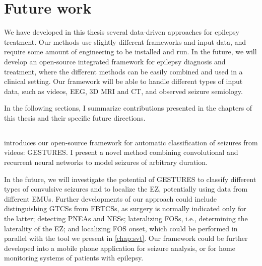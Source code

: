\section{Future work}

We have developed in this thesis several data-driven approaches for epilepsy treatment.
Our methods use slightly different frameworks and input data, and require some amount of engineering to be installed and run.
In the future, we will develop an open-source integrated framework for epilepsy diagnosis and treatment, where the different methods can be easily combined and used in a clinical setting.
Our framework will be able to handle different types of input data, such as videos, \ac{EEG}, 3D \ac{MRI} and \ac{CT}, and observed seizure semiology.


In the following sections, I summarize contributions presented in the chapters of this thesis and their specific future directions.

\subsection{}

 introduces our open-source framework for automatic classification of seizures from videos: \ac{GESTURES}.
I present a novel method combining convolutional and recurrent neural networks to model seizures of arbitrary duration.

In the future, we will investigate the potential of \ac{GESTURES} to classify different types of convulsive seizures and to localize the \ac{EZ}, potentially using data from different \acp{EMU}.
Further developments of our approach could include
distinguishing \acp{GTCS} from \acp{FBTCS}, as surgery is normally indicated only for the latter;
detecting \acp{PNEA} and \acp{NES};
lateralizing \acp{FOS}, i.e., determining the laterality of the \ac{EZ};
and localizing \ac{FOS} onset, which could be performed in parallel with the tool we present in \cref{chap:svt}.
Our framework could be further developed into a mobile phone application for seizure analysis, or for home monitoring systems of patients with epilepsy.


